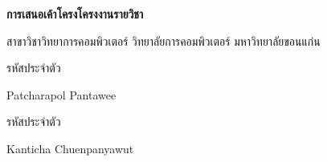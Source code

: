 \begin{center}
    \textbf{การเสนอเค้าโครงโครงงานรายวิชา}

    \vspace{0.5em}
    สาขาวิชาวิทยาการคอมพิวเตอร์ วิทยาลัยการคอมพิวเตอร์ มหาวิทยาลัยขอนแก่น
\end{center}

\vspace{1em}
\noindent
{}รหัสประจำตัว \blank[3.5cm]{}

\noindent
{}Patcharapol Pantawee

\vspace{0.8em}

\noindent
{}รหัสประจำตัว \blank[3.5cm]{}

\noindent
{}Kanticha Chuenpanyawut

\vspace{1.5em}
